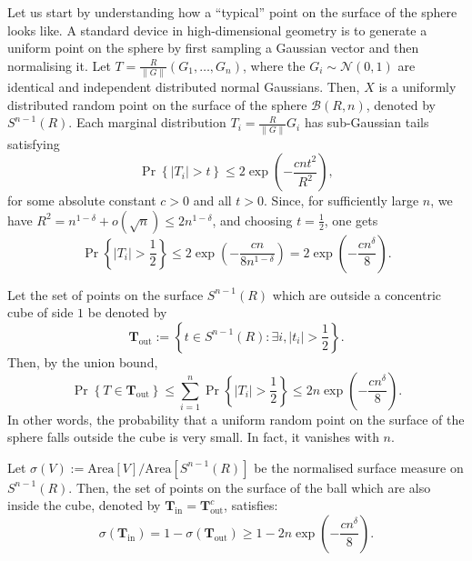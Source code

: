\documentclass[10pt, conference]{IEEEtran}
\newcommand{\1}{\mathds{1}}
\newcommand{\cB}{\mathcal{B}}
\newcommand{\cN}{\mathcal{N}}
\begin{document}
Let us start by understanding how a ``typical'' point on the surface of the sphere looks like. A standard device in high-dimensional geometry is to generate a uniform point on the sphere by first sampling a Gaussian vector and then normalising it. Let $T=\frac{R}{\|G\|}(G_1,\dots,G_n)$, where the $G_i\sim\cN(0,1)$ are identical and independent distributed normal Gaussians. Then, $X$ is a uniformly distributed random point on the surface of the sphere $\cB(R,n)$, denoted by $S^{n-1}(R)$. Each marginal distribution $T_i=\frac{R}{\|G\|}G_i$ has sub-Gaussian tails satisfying
\begin{equation}\label{eq:sub-gaussian_tail}
\Pr\left\{|T_i|> t\right\}\leq 2\exp\left(-\frac{cnt^2}{R^2}\right),
\end{equation}
for some absolute constant $c>0$ and all $t>0$. Since, for sufficiently large $n$, we have $R^2=n^{1-\delta}+o(\sqrt{n})\leq2n^{1-\delta}$, and choosing $t=\frac12$, one gets
\begin{equation}\label{eq:out_cube_1Dcondition}
\!\!\Pr\left\{|T_i|> \frac12\right\}\leq 2\exp\left(-\frac{cn}{8n^{1-\delta}}\right)= 2\exp\left(-\frac{cn^\delta}{8}\right)\!.
\end{equation}

Let the set of points on the surface $S^{n-1}(R)$ which are outside a concentric cube of side $1$ be denoted by
\begin{equation}
\mathbf{T}_{\text{out}}:=\left\{t\in S^{n-1}(R):\exists i, |t_i|>\frac12\right\}.
\end{equation}
Then, by the union bound,
\begin{equation}\label{eq:out_cube_Multi_D_condition}
\!\!\Pr\left\{T\in \mathbf{T}_{\text{out}}\right\}\!\leq\!\sum_{i=1}^n\Pr\!\left\{\!|T_i|> \frac12\!\right\}\!\leq 2n\exp\left(-\frac{cn^\delta}{8}\right)\!.
\end{equation}
In other words, the probability that a uniform random point on the surface of the sphere falls outside the cube is very small. In fact, it vanishes with $n$.

Let $\sigma(V):=\text{Area}[V]/\text{Area}[S^{n-1}(R)]$ be the normalised surface measure on $S^{n-1}(R)$. Then, the set of points on the surface of the ball which are also inside the cube, denoted by $\mathbf{T}_{\text{in}}=\mathbf{T}_{\text{out}}^c$, satisfies:
\begin{equation}
\sigma(\mathbf{T}_\text{in})=1-\sigma(\mathbf{T}_\text{out})\geq 1-2n\exp\left(-\frac{cn^\delta}{8}\right).
\end{equation}
\end{document}
